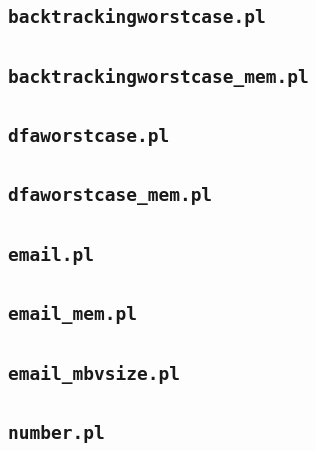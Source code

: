 \subsection{\texttt{backtrackingworstcase.pl}}
\label{sec:backtrackingworstcase.pl}



\subsection{\texttt{backtrackingworstcase\_mem.pl}}
\label{sec:backtrackingworstcase_mem.pl}



\subsection{\texttt{dfaworstcase.pl}}
\label{sec:dfaworstcase.pl}



\subsection{\texttt{dfaworstcase\_mem.pl}}
\label{sec:dfaworstcase_mem.pl}



\subsection{\texttt{email.pl}}
\label{sec:email.pl}



\subsection{\texttt{email\_mem.pl}}
\label{sec:email_mem.pl}



\subsection{\texttt{email\_mbvsize.pl}}
\label{sec:email_mbvsize.pl}



\subsection{\texttt{number.pl}}
\label{sec:number.pl}



